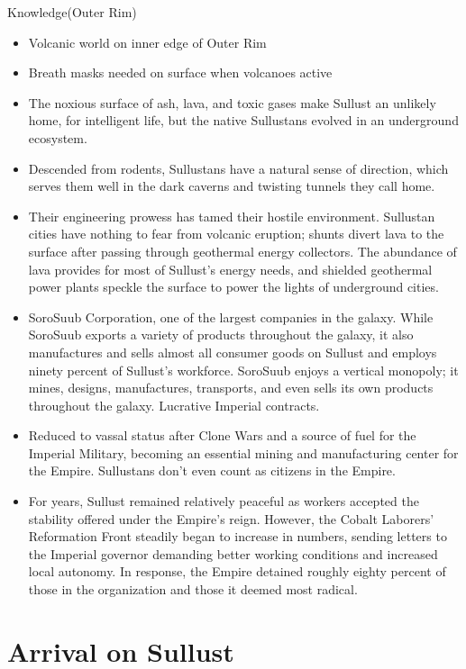 \documentclass{book}
\begin{document}
\difficulty\difficulty Knowledge(Outer Rim)\\
\begin{itemize}
    \item Volcanic world on inner edge of Outer Rim
    \item Breath masks needed on surface when volcanoes active
    \item The noxious surface of ash, lava, and toxic gases make Sullust an unlikely home, for intelligent life, but the native Sullustans evolved in an underground ecosystem.
    \item \advantage Descended from rodents, Sullustans have a natural sense of direction, which serves them well in the dark caverns and twisting tunnels they call home.
    \item \advantage  Their engineering prowess has tamed their hostile environment. Sullustan cities have nothing to fear from volcanic eruption; shunts divert lava to the surface after passing through geothermal energy collectors. The abundance of lava provides for most of Sullust’s energy needs, and shielded geothermal power plants speckle the surface to power the lights of underground cities.
    \item \advantage SoroSuub Corporation, one of the largest companies in the galaxy. While SoroSuub exports a variety of products throughout the galaxy, it also manufactures and sells almost all consumer goods on Sullust and employs ninety percent of Sullust’s workforce. SoroSuub enjoys a vertical monopoly; it mines, designs, manufactures, transports, and even sells its own products throughout the galaxy. Lucrative Imperial contracts.
    \item \advantage Reduced to vassal status after Clone Wars and a source of fuel for the Imperial Military, becoming an essential mining and manufacturing center for the Empire. Sullustans don’t even count as citizens in the Empire.
    \item \triumph For years, Sullust remained relatively peaceful as workers accepted the stability offered under the Empire's reign. However, the Cobalt Laborers' Reformation Front steadily began to increase in numbers, sending letters to the Imperial governor demanding better working conditions and increased local autonomy. In response, the Empire detained roughly eighty percent of those in the organization and those it deemed most radical.
\end{itemize}


\chapter{Arrival on Sullust}
\end{document}

